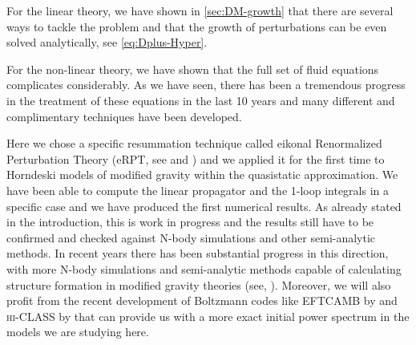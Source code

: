 For the linear theory, we have shown in \cref{sec:DM-growth} that there are several
ways to tackle the problem and that the growth of perturbations can be even solved analytically, see
\cref{eq:Dplus-Hyper}.

For the non-linear theory, we have shown that the full set of fluid equations complicates considerably.
As we have seen, there has been a tremendous progress in the treatment of these equations in the last 10 years and many different
and complimentary techniques have been developed.

Here we chose a specific resummation technique called eikonal Renormalized Perturbation Theory (eRPT, see \cite{anselmi_nonlinear_2012} and
\cite{peloso_galilean_2016}) and we applied it for the first time 
to Horndeski models of modified gravity within the quasistatic approximation.
We have been able to compute the linear propagator and the 1-loop integrals in a specific case and we have 
produced the first numerical results. As already stated in the introduction, this is work in progress and the results
still have to be confirmed and checked against N-body simulations and other semi-analytic methods.
In recent years there has been substantial progress in this direction, with more N-body simulations and semi-analytic
methods capable of calculating structure formation in modified gravity theories (see, \cite{ baldi2014cosmic, winther2015fast, mead_rapid_2014}).
Moreover, we will also profit from the recent development of Boltzmann codes like \textsc{EFTCAMB} by \cite{hu_eftcamb/eftcosmomc:_2014-1} and 
\textsc{hi-CLASS} by \cite{zumalacarregui_hi_class:_2016} that can provide us with a more exact initial power spectrum in the models
we are studying here.





